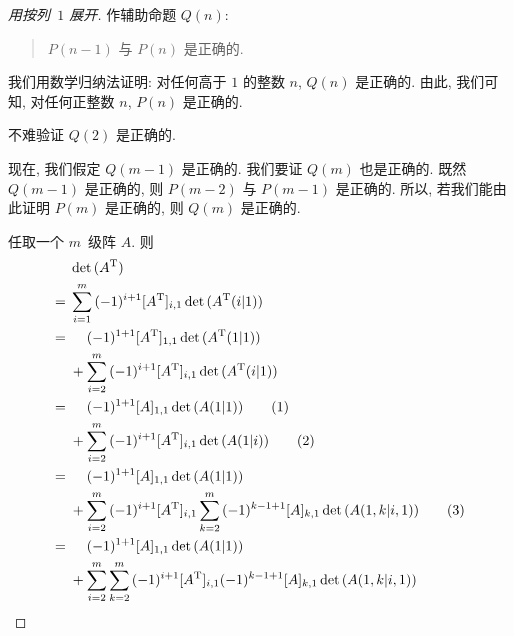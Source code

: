 \begin{proof}[用按列~\(1\) 展开]
    作辅助命题 \(Q(n)\):
    \begin{quotation}
        \(P(n-1)\) 与 \(P(n)\) 是正确的.
    \end{quotation}
    我们用数学归纳法证明:
    对任何高于 \(1\) 的整数 \(n\), \(Q(n)\) 是正确的.
    由此, 我们可知, 对任何正整数 \(n\),
    \(P(n)\) 是正确的.

    不难验证 \(Q(2)\) 是正确的.

    现在, 我们假定 \(Q(m-1)\) 是正确的.
    我们要证 \(Q(m)\) 也是正确的.
    既然 \(Q(m-1)\) 是正确的,
    则 \(P(m-2)\) 与 \(P(m-1)\) 是正确的.
    所以, 若我们能由此证明 \(P(m)\) 是正确的,
    则 \(Q(m)\) 是正确的.

    任取一个 \(m\)~级阵 \(A\).
    则
    \begin{align*}
             & \det {(A^{\mathrm{T}})}
        \\
        = {} &
        \sum_{i = 1}^{m} {
        (-1)^{i+1} [A^{\mathrm{T}}]_{i,1}
        \det {(A^{\mathrm{T}}(i|1))}
        }
        \\
        = {} &
        \hphantom{{} + {}}
        (-1)^{1+1} [A^{\mathrm{T}}]_{1,1}
        \det {(A^{\mathrm{T}}(1|1))}
        \\
             &
        + \sum_{i = 2}^{m} {
        (-1)^{i+1} [A^{\mathrm{T}}]_{i,1}
        \det {(A^{\mathrm{T}}(i|1))}
        }
        \\
        = {} &
        \hphantom{{} + {}}
        (-1)^{1+1} [A]_{1,1} \det {(A(1|1))}
        \tag*{(1)}
        \\
             &
        + \sum_{i = 2}^{m} {
        (-1)^{i+1} [A^{\mathrm{T}}]_{i,1}
        \det {(A(1|i))}
        }
        \tag*{(2)}
        \\
        = {} &
        \hphantom{{} + {}}
        (-1)^{1+1} [A]_{1,1} \det {(A(1|1))}
        \\
             &
        + \sum_{i = 2}^{m} {
        (-1)^{i+1} [A^{\mathrm{T}}]_{i,1}
        \sum_{k = 2}^{m} {
        (-1)^{k-1+1} [A]_{k,1} \det {(A({1,k}|{i,1}))}
        }
        }
        \tag*{(3)}
        \\
        = {} &
        \hphantom{{} + {}}
        (-1)^{1+1} [A]_{1,1} \det {(A(1|1))}
        \\
             &
        + \sum_{i = 2}^{m} {
        \sum_{k = 2}^{m} {
        (-1)^{i+1} [A^{\mathrm{T}}]_{i,1}
        (-1)^{k-1+1} [A]_{k,1} \det {(A({1,k}|{i,1}))}
        }
        }
        \\

\end{align*}
\end{proof}
